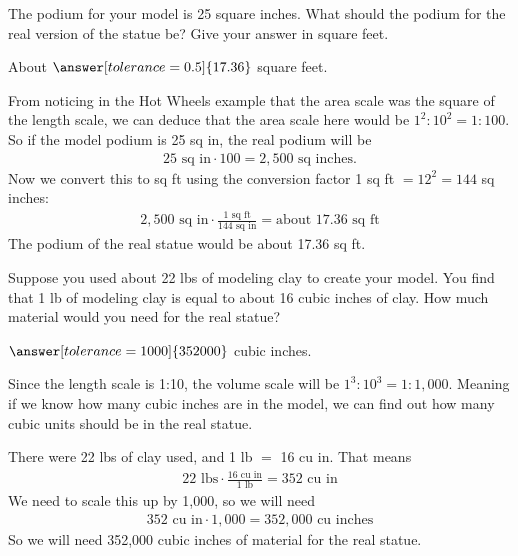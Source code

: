 \documentclass[12pt]{ximera}
\begin{document}
\begin{problem}
The podium for your model is 25 square inches. What should the podium for the real
version of the statue be? Give your answer in square feet.

About $\answer[tolerance=0.5]{17.36}$ square feet.

\begin{solution}
From noticing in the Hot Wheels example that the area scale was the square of the
length scale, we can deduce that the area scale here would be $1^{2} : 10^{2} = 1 :
100$. So if the model podium is 25 sq in, the real podium will be
\begin{gather*}
25\text{ sq in} \cdot 100 = 2{,}500\text{ sq inches}.
\end{gather*}
Now we convert this to sq ft using the conversion factor 1 sq ft $= 12^{2} = 144$ sq
inches:
\begin{gather*}
2{,}500\text{ sq in} \cdot \frac{1\text{ sq ft}}{144\text{ sq in}} = \text{about } 17.36\text{ sq ft}
\end{gather*}
The podium of the real statue would be about 17.36 sq ft.
\end{solution}
\end{problem}

\begin{problem}
Suppose you used about 22 lbs of modeling clay to create your model. You find that 1 lb
of modeling clay is equal to about 16 cubic inches of clay. How much material would you
need for the real statue?

$\answer[tolerance=1000]{352000}$ cubic inches.

\begin{freeResponse}
\end{freeResponse}

\begin{solution}
Since the length scale is 1:10, the volume scale will be $1^{3} : 10^{3} = 1 : 1{,}000$.
Meaning if we know how many cubic inches are in the model, we can find out how many
cubic units should be in the real statue.

There were 22 lbs of clay used, and 1 lb $=$ 16 cu in. That means
\begin{gather*}
22\text{ lbs} \cdot \frac{16\text{ cu in}}{1\text{ lb}} = 352\text{ cu in}
\end{gather*}
We need to scale this up by 1,000, so we will need
\begin{gather*}
352\text{ cu in} \cdot 1{,}000 = 352{,}000\text{ cu inches}
\end{gather*}
So we will need 352,000 cubic inches of material for the real statue.
\end{solution}
\end{problem}
\end{document}
